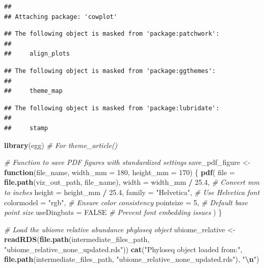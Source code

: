 \documentclass[
]{article}
\newenvironment{Shaded}{\begin{snugshade}}{\end{snugshade}}
\newcommand{\AttributeTok}[1]{\textcolor[rgb]{0.13,0.29,0.53}{#1}}
\newcommand{\CommentTok}[1]{\textcolor[rgb]{0.56,0.35,0.01}{\textit{#1}}}
\newcommand{\ConstantTok}[1]{\textcolor[rgb]{0.56,0.35,0.01}{#1}}
\newcommand{\ControlFlowTok}[1]{\textcolor[rgb]{0.13,0.29,0.53}{\textbf{#1}}}
\newcommand{\DecValTok}[1]{\textcolor[rgb]{0.00,0.00,0.81}{#1}}
\newcommand{\FloatTok}[1]{\textcolor[rgb]{0.00,0.00,0.81}{#1}}
\newcommand{\FunctionTok}[1]{\textcolor[rgb]{0.13,0.29,0.53}{\textbf{#1}}}
\newcommand{\NormalTok}[1]{#1}
\newcommand{\OtherTok}[1]{\textcolor[rgb]{0.56,0.35,0.01}{#1}}
\newcommand{\SpecialCharTok}[1]{\textcolor[rgb]{0.81,0.36,0.00}{\textbf{#1}}}
\newcommand{\StringTok}[1]{\textcolor[rgb]{0.31,0.60,0.02}{#1}}
\begin{document}
\begin{verbatim}
## 
## Attaching package: 'cowplot'
\end{verbatim}

\begin{verbatim}
## The following object is masked from 'package:patchwork':
## 
##     align_plots
\end{verbatim}

\begin{verbatim}
## The following object is masked from 'package:ggthemes':
## 
##     theme_map
\end{verbatim}

\begin{verbatim}
## The following object is masked from 'package:lubridate':
## 
##     stamp
\end{verbatim}

\begin{Shaded}
\begin{Highlighting}[]
\FunctionTok{library}\NormalTok{(egg)            }\CommentTok{\# For theme\_article()}

\CommentTok{\# Function to save PDF figures with standardized settings}
\NormalTok{save\_pdf\_figure }\OtherTok{\textless{}{-}} \ControlFlowTok{function}\NormalTok{(file\_name, }\AttributeTok{width\_mm =} \DecValTok{180}\NormalTok{, }\AttributeTok{height\_mm =} \DecValTok{170}\NormalTok{) \{}
  \FunctionTok{pdf}\NormalTok{(}
    \AttributeTok{file =} \FunctionTok{file.path}\NormalTok{(viz\_out\_path, file\_name),}
    \AttributeTok{width =}\NormalTok{ width\_mm }\SpecialCharTok{/} \FloatTok{25.4}\NormalTok{,  }\CommentTok{\# Convert mm to inches}
    \AttributeTok{height =}\NormalTok{ height\_mm }\SpecialCharTok{/} \FloatTok{25.4}\NormalTok{,}
    \AttributeTok{family =} \StringTok{"Helvetica"}\NormalTok{,     }\CommentTok{\# Use Helvetica font}
    \AttributeTok{colormodel =} \StringTok{"rgb"}\NormalTok{,       }\CommentTok{\# Ensure color consistency}
    \AttributeTok{pointsize =} \DecValTok{5}\NormalTok{,            }\CommentTok{\# Default base point size}
    \AttributeTok{useDingbats =} \ConstantTok{FALSE}       \CommentTok{\# Prevent font embedding issues}
\NormalTok{  )}
\NormalTok{\}}

\CommentTok{\# Load the ubiome relative abundance phyloseq object}
\NormalTok{ubiome\_relative }\OtherTok{\textless{}{-}} \FunctionTok{readRDS}\NormalTok{(}\FunctionTok{file.path}\NormalTok{(intermediate\_files\_path, }\StringTok{"ubiome\_relative\_none\_updated.rds"}\NormalTok{))}
\FunctionTok{cat}\NormalTok{(}\StringTok{"Phyloseq object loaded from:"}\NormalTok{, }\FunctionTok{file.path}\NormalTok{(intermediate\_files\_path, }\StringTok{"ubiome\_relative\_none\_updated.rds"}\NormalTok{), }\StringTok{"}\SpecialCharTok{\textbackslash{}n}\StringTok{"}\NormalTok{)}
\end{Highlighting}
\end{Shaded}
\end{document}
